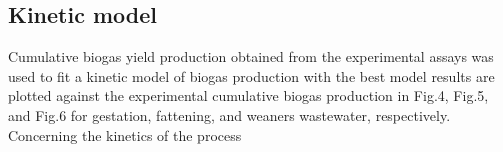 \subsection{Kinetic model}
Cumulative biogas yield production obtained from the experimental assays was used to fit a kinetic model of biogas production with the best model results are plotted against the experimental cumulative biogas production in Fig.4, Fig.5, and Fig.6 for gestation, fattening, and weaners wastewater, respectively.
Concerning the kinetics of the process